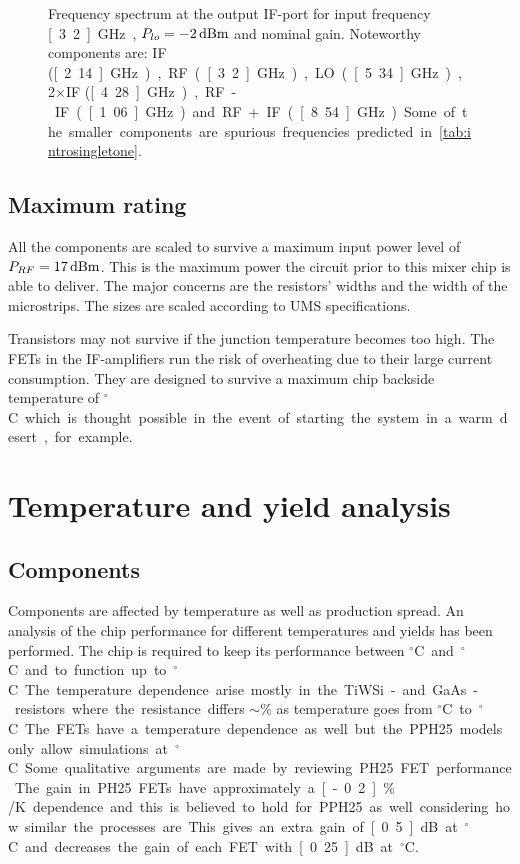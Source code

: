 			\begin{figure}[hbt!]
				\centering
				\caption[IF-port output spectrum.]{Frequency spectrum at the output IF-port for input frequency \unit[3.2]{GHz}, $P_{lo}=\unit[-2]{dBm}$ and nominal gain. Noteworthy components are: IF (\unit[2.14]{GHz}), RF (\unit[3.2]{GHz}), LO (\unit[5.34]{GHz}), 2$\times$IF (\unit[4.28]{GHz}), RF-IF (\unit[1.06]{GHz}) and RF+IF (\unit[8.54]{GHz}). Some of the smaller components are spurious frequencies predicted in \autoref{tab:introsingletone}.}\label{fig:sysspectrum}
			\end{figure}
			

			
		\subsection{Maximum rating}
			All the components are scaled to survive a maximum input power level of $P_{RF}=\unit[17]{dBm}$. This is the maximum power the circuit prior to this mixer chip is able to deliver. The major concerns are the resistors' widths and the width of the microstrips. The sizes are scaled according to UMS specifications.\autocite{pph25manual}
			
			Transistors may not survive if the junction temperature becomes too high. The FETs in the IF-amplifiers run the risk of overheating due to their large current consumption. They are designed to survive a maximum chip backside temperature of \unit[100]{$^\circ$C} which is thought possible in the event of starting the system in a warm desert, for example.
				
	\section{Temperature and yield analysis}	
		\subsection{Components}
			Components are affected by temperature as well as production spread. An analysis of the chip performance for different temperatures and yields has been performed. The chip is required to keep its performance between \unit[-40]{$^\circ$C} and \unit[55]{$^\circ$C} and to function up to \unit[85]{$^\circ$C}. 			
			The temperature dependence arise mostly in the TiWSi- and GaAs-resistors where the resistance differs $\sim$\unit[10]{\%} as temperature goes from \unit[20]{$^\circ$C} to \unit[85]{$^\circ$C}. The FETs have a temperature dependence as well but the PPH25 models only allow simulations at \unit[20]{$^\circ$C}. Some qualitative arguments are made by reviewing PH25 FET performance. The gain in PH25 FETs have approximately a \unit[-0.2]{$\%$/K} dependence and this is believed to hold for PPH25 as well considering how similar the processes are. This gives an extra gain of \unit[0.5]{dB} at \unit[-40]{$^\circ$C} and decreases the gain of each FET with \unit[0.25]{dB} at \unit[55]{$^\circ$C}.		

